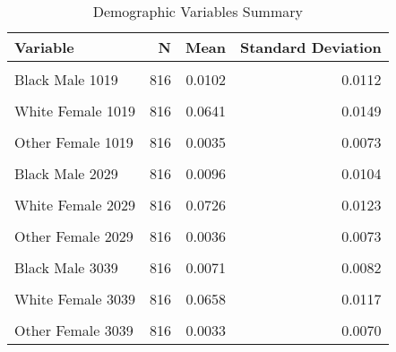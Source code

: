 \begin{table}[H]

\caption{\label{tab:tab:replicatetable2b}Demographic Variables Summary}
\centering
\begin{tabular}[t]{lrrr}
\toprule
Variable & N & Mean & Standard Deviation\\
\midrule
\cellcolor{gray!6}{White Male 1019} & \cellcolor{gray!6}{816} & \cellcolor{gray!6}{0.0672} & \cellcolor{gray!6}{0.0151}\\
Black Male 1019 & 816 & 0.0102 & 0.0112\\
\cellcolor{gray!6}{Other Male 1019} & \cellcolor{gray!6}{816} & \cellcolor{gray!6}{0.0036} & \cellcolor{gray!6}{0.0076}\\
White Female 1019 & 816 & 0.0641 & 0.0149\\
\cellcolor{gray!6}{Black Female 1019} & \cellcolor{gray!6}{816} & \cellcolor{gray!6}{0.0101} & \cellcolor{gray!6}{0.0114}\\
\addlinespace
Other Female 1019 & 816 & 0.0035 & 0.0073\\
\cellcolor{gray!6}{White Male 2029} & \cellcolor{gray!6}{816} & \cellcolor{gray!6}{0.0741} & \cellcolor{gray!6}{0.0120}\\
Black Male 2029 & 816 & 0.0096 & 0.0104\\
\cellcolor{gray!6}{Other Male 2029} & \cellcolor{gray!6}{816} & \cellcolor{gray!6}{0.0035} & \cellcolor{gray!6}{0.0072}\\
White Female 2029 & 816 & 0.0726 & 0.0123\\
\addlinespace
\cellcolor{gray!6}{Black Female 2029} & \cellcolor{gray!6}{816} & \cellcolor{gray!6}{0.0104} & \cellcolor{gray!6}{0.0123}\\
Other Female 2029 & 816 & 0.0036 & 0.0073\\
\cellcolor{gray!6}{White Male 3039} & \cellcolor{gray!6}{816} & \cellcolor{gray!6}{0.0663} & \cellcolor{gray!6}{0.0118}\\
Black Male 3039 & 816 & 0.0071 & 0.0082\\
\cellcolor{gray!6}{Other Male 3039} & \cellcolor{gray!6}{816} & \cellcolor{gray!6}{0.0030} & \cellcolor{gray!6}{0.0066}\\
\addlinespace
White Female 3039 & 816 & 0.0658 & 0.0117\\
\cellcolor{gray!6}{Black Female 3039} & \cellcolor{gray!6}{816} & \cellcolor{gray!6}{0.0081} & \cellcolor{gray!6}{0.0098}\\
Other Female 3039 & 816 & 0.0033 & 0.0070\\

\end{tabular}
\end{table}
